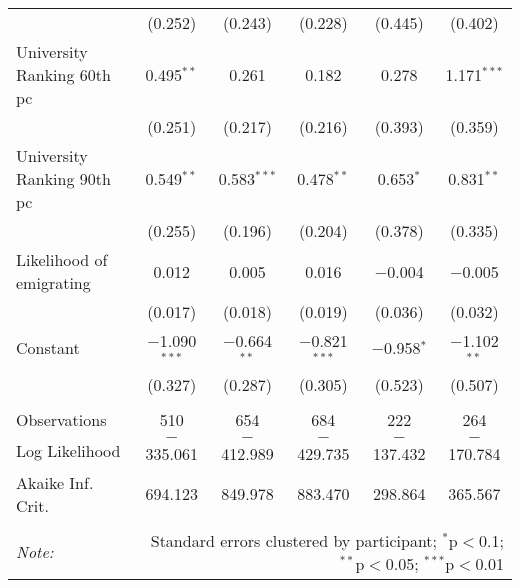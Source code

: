 \documentclass[12pt]{article}
\begin{document}
\begin{appendices}
\begin{landscape}
\begin{table}[!htbp]
\begin{tabular}{@{\extracolsep{5pt}}lccccc}
  & (0.252) & (0.243) & (0.228) & (0.445) & (0.402) \\ 
  University Ranking 60th pc & 0.495$^{**}$ & 0.261 & 0.182 & 0.278 & 1.171$^{***}$ \\ 
  & (0.251) & (0.217) & (0.216) & (0.393) & (0.359) \\ 
  University Ranking 90th pc & 0.549$^{**}$ & 0.583$^{***}$ & 0.478$^{**}$ & 0.653$^{*}$ & 0.831$^{**}$ \\ 
  & (0.255) & (0.196) & (0.204) & (0.378) & (0.335) \\ 
  Likelihood of emigrating & 0.012 & 0.005 & 0.016 & $-$0.004 & $-$0.005 \\ 
  & (0.017) & (0.018) & (0.019) & (0.036) & (0.032) \\ 
  Constant & $-$1.090$^{***}$ & $-$0.664$^{**}$ & $-$0.821$^{***}$ & $-$0.958$^{*}$ & $-$1.102$^{**}$ \\ 
  & (0.327) & (0.287) & (0.305) & (0.523) & (0.507) \\ 
 \hline \\[-1.8ex] 
Observations & 510 & 654 & 684 & 222 & 264 \\ 
Log Likelihood & $-$335.061 & $-$412.989 & $-$429.735 & $-$137.432 & $-$170.784 \\ 
Akaike Inf. Crit. & 694.123 & 849.978 & 883.470 & 298.864 & 365.567 \\ 
\hline 
\hline \\[-1.8ex] 
\textit{Note:}  & \multicolumn{5}{r}{Standard errors clustered by participant; $^{*}$p$<$0.1; $^{**}$p$<$0.05; $^{***}$p$<$0.01} \\ 
\end{tabular} 
\end{table} 
\end{landscape}

\begin{comment}



\end{comment}
\end{appendices}
\end{document}

